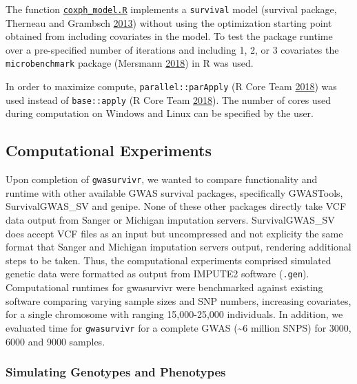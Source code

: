 \documentclass[]{DissertateOSU}
\begin{document}
The function
\href{https://github.com/suchestoncampbelllab/gwasurvivr_manuscript/blob/master/supplemental_data/code/coxph_model.R}{\texttt{coxph\_model.R}}
implements a \texttt{survival} model (survival package, Therneau and
Grambsch \protect\hyperlink{ref-therneau2013}{2013}) without using the
optimization starting point obtained from including covariates in the
model. To test the package runtime over a pre-specified number of
iterations and including 1, 2, or 3 covariates the
\texttt{microbenchmark} package (Mersmann
\protect\hyperlink{ref-microbenchmark}{2018}) in R was used.

In order to maximize compute, \texttt{parallel::parApply} (R Core Team
\protect\hyperlink{ref-r_core}{2018}) was used instead of
\texttt{base::apply} (R Core Team \protect\hyperlink{ref-r_core}{2018}).
The number of cores used during computation on Windows and Linux can be
specified by the user.

\doublespacing 

\subsection{Computational Experiments}\label{computational-experiments}

Upon completion of \texttt{gwasurvivr}, we wanted to compare
functionality and runtime with other available GWAS survival packages,
specifically GWASTools, SurvivalGWAS\_SV and genipe. None of these other
packages directly take VCF data output from Sanger or Michigan
imputation servers. SurvivalGWAS\_SV does accept VCF files as an input
but uncompressed and not explicity the same format that Sanger and
Michigan imputation servers output, rendering additional steps to be
taken. Thus, the computational experiments comprised simulated genetic
data were formatted as output from IMPUTE2 software (\texttt{.gen}).
Computational runtimes for gwasurvivr were benchmarked against existing
software comparing varying sample sizes and SNP numbers, increasing
covariates, for a single chromosome with ranging 15,000-25,000
individuals. In addition, we evaluated time for \texttt{gwasurvivr} for
a complete GWAS (\textasciitilde{}6 million SNPS) for 3000, 6000 and
9000 samples.

\subsubsection{Simulating Genotypes and
Phenotypes}\label{simulating-genotypes-and-phenotypes}
\end{document}
